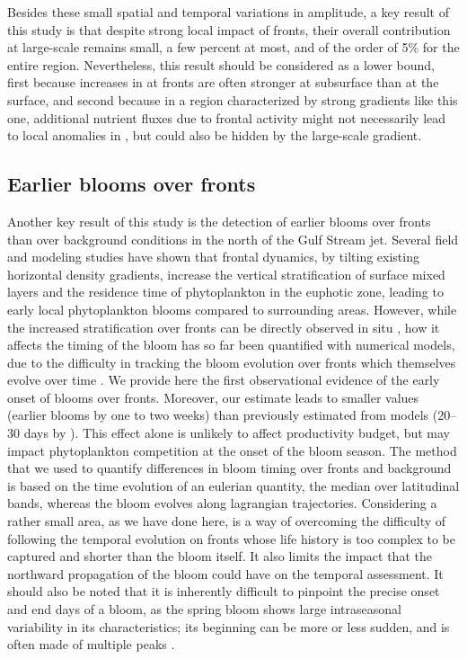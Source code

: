 Besides these small spatial and temporal variations in amplitude, a key result of this study is that despite strong local impact of fronts, their overall contribution at large-scale remains small, a few percent at most, and of the order of 5\% for the entire region.
Nevertheless, this result should be considered as a lower bound, first because increases in  at fronts are often stronger at subsurface than at the surface, and second because in a region characterized by strong gradients like this one, additional nutrient fluxes due to frontal activity might not necessarily lead to local anomalies in , but could also be hidden by the large-scale gradient.


\subsection{Earlier blooms over fronts}

Another key result of this study is the detection of earlier blooms over fronts than over background conditions in the north of the Gulf Stream jet.
Several field and modeling studies have shown that frontal dynamics, by tilting existing horizontal density gradients, increase the vertical stratification of surface mixed layers \parencite{taylor_2011} and the residence time of phytoplankton in the euphotic zone, leading to early local phytoplankton blooms compared to surrounding areas.
However, while the increased stratification over fronts can be directly observed in situ \parencite{karleskind_2011, mahadevan_2012}, how it affects the timing of the bloom has so far been quantified with numerical models, due to the difficulty in tracking the bloom evolution over fronts which themselves evolve over time \citep{levy_2000, karleskind_2011, mahadevan_2012}.
We provide here the first observational evidence of the early onset of blooms over fronts.
Moreover, our estimate leads to smaller values (earlier blooms by one to two weeks) than previously estimated from models (20--30 days by \textcite{mahadevan_2012}).
This effect alone is unlikely to affect productivity budget, but may impact phytoplankton competition at the onset of the bloom season.
The method that we used to quantify differences in bloom timing over fronts and background is based on the time evolution of an eulerian quantity, the  median over latitudinal bands, whereas the bloom evolves along lagrangian trajectories.
Considering a rather small area, as we have done here, is a way of overcoming the difficulty of following the temporal evolution on fronts whose life history is too complex to be captured and shorter than the bloom itself.
It also limits the impact that the northward propagation of the bloom could have on the temporal assessment.
It should also be noted that it is inherently difficult to pinpoint the precise onset and end days of a bloom, as the spring bloom shows large intraseasonal variability in its characteristics; its beginning can be more or less sudden, and is often made of multiple peaks \parencite{keerthi_2020}.


